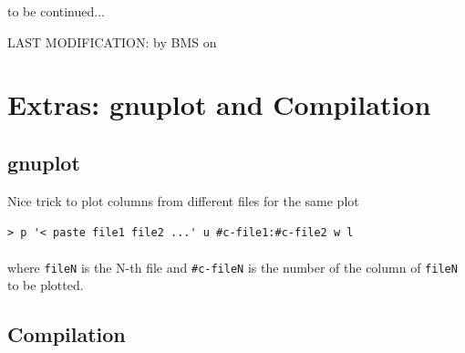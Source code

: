 \documentclass[12pt]{article}
\numberwithin{equation}{section}
\begin{document}
to be continued$\ldots$

LAST MODIFICATION: by BMS on \date{\today }

\appendix

\section{Extras: gnuplot and Compilation}

\subsection{gnuplot}

Nice trick to plot columns from different files for the same plot

\verb=> p '< paste file1 file2 ...' u #c-file1:#c-file2 w l=\\\\
where \verb=fileN= is the N-th file and 
\verb=#c-fileN= is the number of the column of \verb=fileN= to be plotted. 



\subsection{Compilation}
\end{document}
